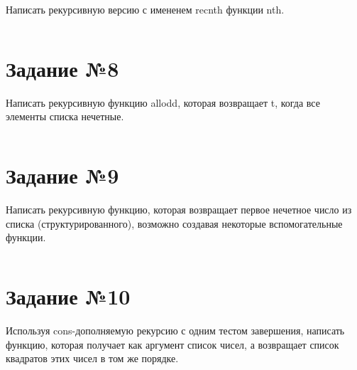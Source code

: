 Написать рекурсивную версию с имененем recnth функции nth.

\vspace{4mm}
\begin{minipage}{0.92\linewidth}
\begin{lstlisting}
\end{lstlisting}
\end{minipage}

\section{Задание №8}

Написать рекурсивную функцию allodd, которая возвращает t, когда все элементы
списка нечетные.

\vspace{4mm}
\begin{minipage}{0.92\linewidth}
\begin{lstlisting}
\end{lstlisting}
\end{minipage}

\section{Задание №9}

Написать рекурсивную функцию, которая возвращает первое нечетное число
из списка (структурированного), возможно создавая некоторые вспомогательные
функции.

\vspace{4mm}
\begin{minipage}{0.92\linewidth}
\begin{lstlisting}
\end{lstlisting}
\end{minipage}

\section{Задание №10}

Используя cons-дополняемую рекурсию с одним тестом завершения, написать функцию,
которая получает как аргумент список чисел, а возвращает список квадратов этих
чисел в том же порядке.

\vspace{4mm}
\begin{minipage}{0.92\linewidth}
\begin{lstlisting}
\end{lstlisting}
\end{minipage}

